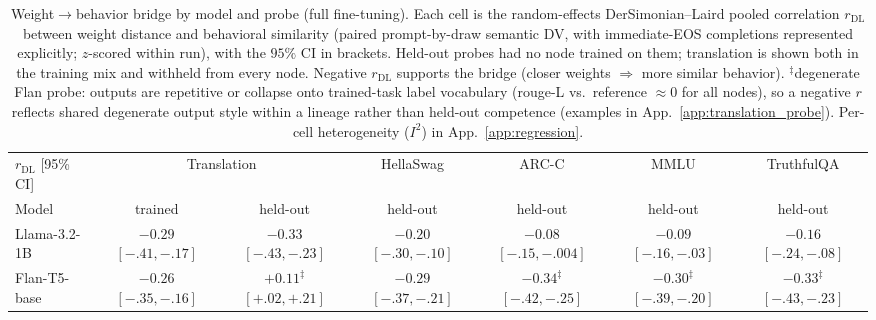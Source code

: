 \documentclass{article}
\theoremstyle{definition}
\theoremstyle{plain}
\begin{document}
\begin{table}[t]
\caption{Weight$\to$behavior bridge by model and probe (full fine-tuning). Each cell is the
  random-effects DerSimonian--Laird pooled correlation $r_{\mathrm{DL}}$ between weight distance and behavioral
similarity (paired prompt-by-draw semantic DV, with immediate-EOS completions represented explicitly;
$z$-scored within run), with the $95\%$ CI in brackets.
Held-out probes had no node trained on them; translation is shown both in the training mix
  and withheld from every node. Negative $r_{\mathrm{DL}}$ supports the bridge (closer weights $\Rightarrow$ more
similar behavior). $^\ddagger$degenerate Flan probe: outputs are repetitive or collapse onto trained-task label
vocabulary (rouge-L vs.\ reference $\approx 0$ for all nodes), so a negative $r$ reflects shared
degenerate output style within a lineage rather than held-out competence (examples in
App.~\ref{app:translation_probe}). Per-cell heterogeneity ($I^2$) in App.~\ref{app:regression}.}
\label{tab:behavior_holdout}
\centering
\small
\setlength{\tabcolsep}{5pt}
\begin{tabular}{lcccccc}
\toprule
$r_{\mathrm{DL}}$ [95\% CI] & \multicolumn{2}{c}{Translation} & HellaSwag & ARC-C & MMLU & TruthfulQA \\
\cmidrule(lr){2-3}
Model & trained & held-out & held-out & held-out & held-out & held-out \\
\midrule
Llama-3.2-1B & \shortstack{$-0.29$\\{\scriptsize$[-.41,-.17]$}} & \shortstack{$-0.33$\\{\scriptsize$[-.43,-.23]$}} & \shortstack{$-0.20$\\{\scriptsize$[-.30,-.10]$}} & \shortstack{$-0.08$\\{\scriptsize$[-.15,-.004]$}} & \shortstack{$-0.09$\\{\scriptsize$[-.16,-.03]$}} & \shortstack{$-0.16$\\{\scriptsize$[-.24,-.08]$}} \\
\addlinespace
Flan-T5-base & \shortstack{$-0.26$\\{\scriptsize$[-.35,-.16]$}} & \shortstack{$+0.11^{\ddagger}$\\{\scriptsize$[+.02,+.21]$}} & \shortstack{$-0.29$\\{\scriptsize$[-.37,-.21]$}} & \shortstack{$-0.34^{\ddagger}$\\{\scriptsize$[-.42,-.25]$}} & \shortstack{$-0.30^{\ddagger}$\\{\scriptsize$[-.39,-.20]$}} & \shortstack{$-0.33^{\ddagger}$\\{\scriptsize$[-.43,-.23]$}} \\
\bottomrule
\end{tabular}
\end{table}
\end{document}
